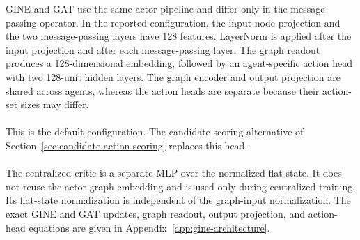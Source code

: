 GINE and GAT use the same actor pipeline and differ only in the
message-passing operator. In the reported configuration, the input node
projection and the two message-passing layers have 128 features. LayerNorm is
applied after the input projection and after each message-passing layer. The
graph readout produces a 128-dimensional embedding, followed by an
agent-specific action head with two 128-unit hidden layers. The graph encoder
and output projection are shared across agents, whereas the action heads are
separate because their action-set sizes may differ.
\\
\\
This is the default configuration. The
candidate-scoring alternative of Section~\ref{sec:candidate-action-scoring}
replaces this head.
\\
\\
The centralized critic is a separate MLP over the normalized flat state. It
does not reuse the actor graph embedding and is used only during centralized
training. Its flat-state normalization is independent of the graph-input
normalization. The exact GINE and GAT updates, graph readout, output projection,
and action-head equations are given in
Appendix~\ref{app:gine-architecture}.

